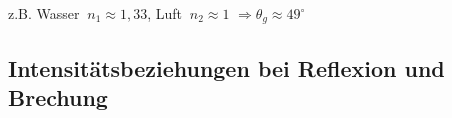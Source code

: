 z.B. Wasser $ \ n_1 \approx 1{,}33 $, Luft $ \ n_2 \approx 1 $ $ \Rightarrow \theta_g \approx 49 ^\circ $
\begin{comment}
\begin{tikzpicture}
\draw[->] (-5,0) -- (5,0);
\draw[->] (0,-5) -- (0,5);
\draw [domain=-3.75:3.75, samples=500] plot (\x, {2 * cos(1 / 4 * 15 * \x r) * exp(- (\x)^(2) * 0.25});
\end{tikzpicture}
\end{comment}


\subsection{Intensitätsbeziehungen bei Reflexion und Brechung}

